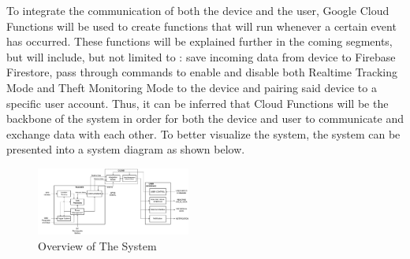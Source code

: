 \documentclass[conference]{IEEEtran}
\begin{document}
To integrate the communication of both the device and the user, Google Cloud Functions will be used to create functions that will run whenever a certain event has occurred. These functions will be explained further in the coming segments, but will include, but not limited to : 
save incoming data from device to Firebase Firestore, pass through commands to enable and disable both Realtime Tracking Mode and Theft Monitoring Mode to the device and pairing said device to a specific user account. Thus, it can be inferred that Cloud Functions will be the 
backbone of the system in order for both the device and user to communicate and exchange data with each other. To better visualize the system, the system can be presented into a system diagram as shown below. 

\begin{figure}[htbp]
    \centering
    \includegraphics[width=0.45\textwidth]{skematikdiagram1}
    \caption{Overview of The System}
    \label{fig1}
\end{figure}
\end{document}
